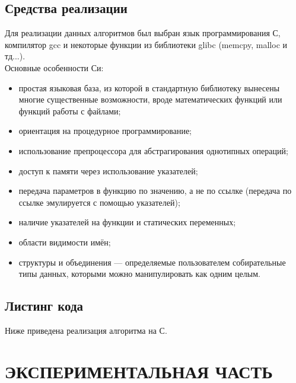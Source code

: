 \documentclass[a4paper,12pt]{article}
\begin{document}
\newpage
\subsection{Средства реализации}
Для реализации данных алгоритмов был выбран язык программирования С, компилятор gcc и некоторые функции из библиотеки glibc (memcpy, malloc и тд...). \\
Основные особенности Си: \\
\begin{itemize}
\item простая языковая база, из которой в стандартную библиотеку вынесены многие существенные возможности, вроде математических функций или функций работы с файлами;
\item ориентация на процедурное программирование;
\item использование препроцессора для абстрагирования однотипных операций;
\item доступ к памяти через использование указателей;
\item передача параметров в функцию по значению, а не по ссылке (передача по ссылке эмулируется с помощью указателей);
\item наличие указателей на функции и статических переменных;
\item области видимости имён;
\item структуры и объединения — определяемые пользователем собирательные типы данных, которыми можно манипулировать как одним целым.
\end{itemize}


\newpage
\subsection{Листинг кода}
Ниже приведена реализация алгоритма на С.\\



\newpage
\section{ЭКСПЕРИМЕНТАЛЬНАЯ ЧАСТЬ}
\end{document}
